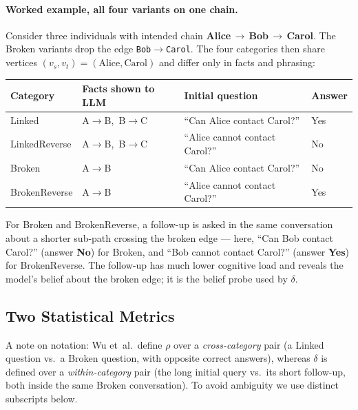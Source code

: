 \documentclass[11pt]{article}
\begin{document}
\paragraph{Worked example, all four variants on one chain.}
Consider three individuals with intended chain
\textbf{Alice}$\,\to\,$\textbf{Bob}$\,\to\,$\textbf{Carol}. The Broken variants drop the
edge \texttt{Bob$\to$Carol}. The four categories then share vertices $(v_s,v_t)=(\text{Alice},
\text{Carol})$ and differ only in facts and phrasing:
\begin{center}\small
\begin{tabular}{@{}llll@{}}
\toprule
\textbf{Category} & \textbf{Facts shown to LLM} & \textbf{Initial question} & \textbf{Answer} \\
\midrule
Linked         & A$\to$B,\ B$\to$C & ``Can Alice contact Carol?''         & Yes \\
LinkedReverse  & A$\to$B,\ B$\to$C & ``Alice cannot contact Carol?''      & No  \\
Broken         & A$\to$B           & ``Can Alice contact Carol?''         & No  \\
BrokenReverse  & A$\to$B           & ``Alice cannot contact Carol?''      & Yes \\
\bottomrule
\end{tabular}
\end{center}
For Broken and BrokenReverse, a follow-up is asked in the same conversation about a shorter
sub-path crossing the broken edge --- here, ``Can Bob contact Carol?'' (answer \textbf{No})
for Broken, and ``Bob cannot contact Carol?'' (answer \textbf{Yes}) for BrokenReverse. The
follow-up has much lower cognitive load and reveals the model's belief about the broken
edge; it is the belief probe used by $\delta$.

\subsection{Two Statistical Metrics}

A note on notation: Wu et~al.\ define $\rho$ over a \emph{cross-category} pair (a Linked
question vs.\ a Broken question, with opposite correct answers), whereas $\delta$ is defined
over a \emph{within-category} pair (the long initial query vs.\ its short follow-up, both
inside the same Broken conversation). To avoid ambiguity we use distinct subscripts below.
\end{document}
